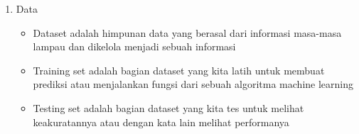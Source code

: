 \begin{enumerate}
\begin{itemize}
    \end{itemize}
    \item Data
    \begin{itemize}
        \item Dataset adalah himpunan data yang berasal dari informasi masa-masa lampau dan dikelola menjadi sebuah informasi
        \item Training set adalah bagian dataset yang kita latih untuk membuat prediksi atau menjalankan fungsi dari sebuah algoritma machine learning
        \item Testing set adalah bagian dataset yang kita tes untuk melihat keakuratannya atau dengan kata lain melihat performanya
    \end{itemize}
\end{enumerate}